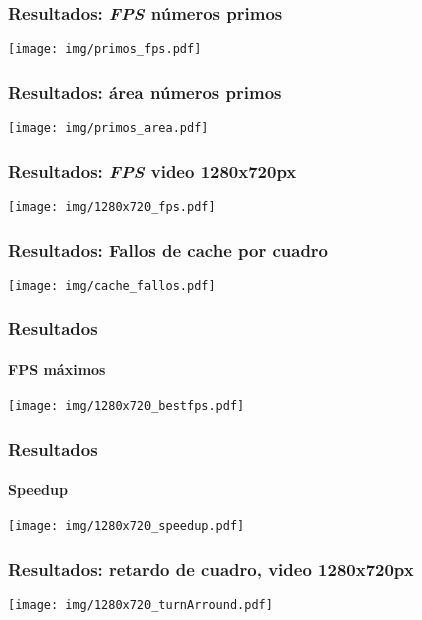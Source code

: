 \documentclass[11pt,a4paper,spanish]{beamer}
\begin{document}
\begin{frame}

\frametitle{Resultados: \emph{FPS} números primos}

\texttt{[image: img/primos\_fps.pdf]}

\end{frame}

\begin{frame}

\frametitle{Resultados: área números primos}

\texttt{[image: img/primos\_area.pdf]}

\end{frame}

\begin{frame}

\frametitle{Resultados: \emph{FPS} video 1280x720px}

\texttt{[image: img/1280x720\_fps.pdf]}

\end{frame}

\begin{frame}

\frametitle{Resultados: Fallos de cache por cuadro}

\texttt{[image: img/cache\_fallos.pdf]}

\end{frame}

\begin{frame}

\frametitle{Resultados}

\framesubtitle{FPS máximos}

\texttt{[image: img/1280x720\_bestfps.pdf]}

\end{frame}

\begin{frame}

\frametitle{Resultados}

\framesubtitle{Speedup}

\texttt{[image: img/1280x720\_speedup.pdf]}

\end{frame}

\begin{frame}

\frametitle{Resultados: retardo de cuadro, video 1280x720px}

\texttt{[image: img/1280x720\_turnArround.pdf]}

\end{frame}
\end{document}
